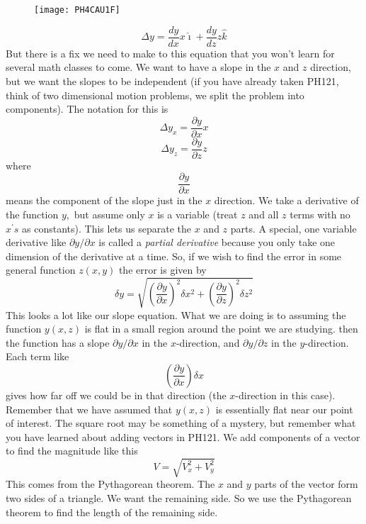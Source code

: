 \begin{figure}[h!]
\texttt{[image: PH4CAU1F]}
\end{figure}%
\begin{equation*}
\Delta y=\frac{dy}{dx}x\hat{\imath}+\frac{dy}{dz}z\hat{k}
\end{equation*}%
But there is a fix we need to make to this equation that you won't learn for
several math classes to come. We want to have a slope in the $x$ and $z$
direction, but we want the slopes to be independent (if you have already
taken PH121, think of two dimensional motion problems, we split the problem
into components). The notation for this is%
\begin{equation*}
\Delta y_{x}=\frac{\partial y}{\partial x}x
\end{equation*}%
\begin{equation*}
\Delta y_{z}=\frac{\partial y}{\partial z}z
\end{equation*}%
where 
\begin{equation*}
\frac{\partial y}{\partial x}
\end{equation*}%
means the component of the slope just in the $x$ direction. We take a
derivative of the function $y,$ but assume only $x$ is a variable (treat $z$
and all $z$ terms with no $x^{\prime }s$ as constants). This lets us
separate the $x$ and $z$ parts. A special, one variable derivative like $%
\partial y/\partial x$ is called a \emph{partial derivative} because you
only take one dimension of the derivative at a time. So, if we wish to find
the error in some general function $z\left( x,y\right) $ the error is given
by 
\begin{equation*}
\delta y=\sqrt{\left( \frac{\partial y}{\partial x}\right) ^{2}\delta
x^{2}+\left( \frac{\partial y}{\partial z}\right) ^{2}\delta z^{2}}
\end{equation*}%
This looks a lot like our slope equation. What we are doing is to assuming
the function $y\left( x,z\right) $ is flat in a small region around the
point we are studying. then the function has a slope $\partial y/\partial x$
in the $x$-direction, and $\partial y/\partial z$ in the $y$-direction. Each
term like 
\begin{equation*}
\left( \frac{\partial y}{\partial x}\right) \delta x
\end{equation*}%
gives how far off we could be in that direction (the $x$-direction in this
case). Remember that we have assumed that $y\left( x,z\right) $ is
essentially flat near our point of interest. The square root may be
something of a mystery, but remember what you have learned about adding
vectors in PH121. We add components of a vector to find the magnitude like
this 
\begin{equation*}
V=\sqrt{V_{x}^{2}+V_{y}^{2}}
\end{equation*}%
This comes from the Pythagorean theorem. The $x$ and $y$ parts of the vector
form two sides of a triangle. We want the remaining side. So we use the
Pythagorean theorem to find the length of the remaining side.

